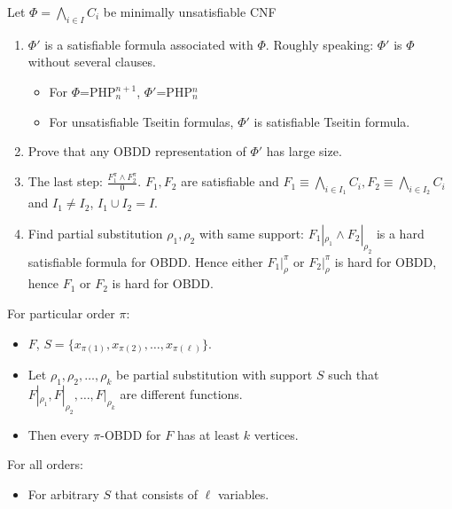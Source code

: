 

{
Let $\Phi=\bigwedge_{i\in I} C_i$ be minimally unsatisfiable CNF
\begin{enumerate}
\item $\Phi'$ is a satisfiable formula associated with $\Phi$. Roughly speaking: $\Phi'$ is $\Phi$ without several clauses.
\begin{itemize}
   \item For $\Phi$=PHP$^{n+1}_{n}$, $\Phi'$=PHP$^{n}_{n}$
   \item For unsatisfiable Tseitin formulas, $\Phi'$ is satisfiable Tseitin formula.
\end{itemize}
\item Prove that any OBDD representation of $\Phi'$ has large size.
\item The last step: $\frac{F_1^{\pi}\land F_2^{\pi}}{0}$. $F_1, F_2$ are satisfiable and $F_1\equiv \bigwedge_{i\in I_1} C_i, F_2\equiv \bigwedge_{i\in I_2} C_i$
and $I_1\neq I_2$, $I_1\cup I_2=I$.
\item Find partial substitution $\rho_1, \rho_2$ with same support: $F_1|_{\rho_1} \land F_2|_{\rho_2}$ is a hard satisfiable formula for OBDD.
Hence either $F_1|_{\rho}^{\pi}$ or $F_2|_{\rho}^{\pi}$ is hard for OBDD, hence $F_1$ or $F_2$ is hard for OBDD.                                                                 
\end{enumerate}
}

{
For particular order $\pi$:
\begin{itemize}
\item $F$, $S=\{x_{\pi(1)}, x_{\pi(2)}, \dots, x_{\pi(\ell)} \}$.
\item Let $\rho_1,\rho_2,\dots, \rho_k$ be partial substitution with support $S$ such that
$F|_{\rho_1}, F|_{\rho_2},\dots,F|_{\rho_k}$ are different functions.
\item Then every $\pi$-OBDD for $F$ has at least $k$ vertices.
\end{itemize}

\pause
For all orders:
\begin{itemize}
\item For arbitrary $S$ that consists of $\ell$ variables.
\end{itemize}

}


